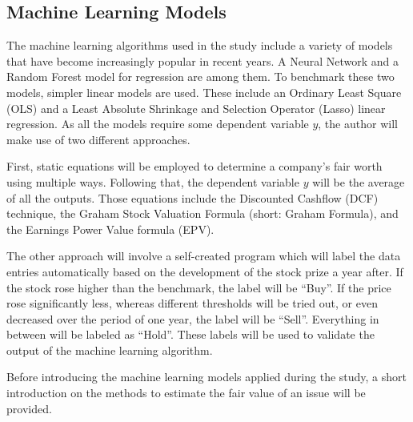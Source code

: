 \documentclass{imc-inf}
\begin{document}
\subsection{Machine Learning Models}%
The machine learning algorithms used in the study include a variety of models that have become increasingly popular in recent years. A Neural Network and a Random Forest model for regression are among them. To benchmark these two models, simpler linear models are used. These include an Ordinary Least Square (OLS) and a Least Absolute Shrinkage and Selection Operator (Lasso) linear regression. As all the models require some dependent variable $y$, the author will make use of two different approaches. 

First, static equations will be employed to determine a company's fair worth using multiple ways. Following that, the dependent variable $y$ will be the average of all the outputs. Those equations include the Discounted Cashflow (DCF) technique, the Graham Stock Valuation Formula (short: Graham Formula), and the Earnings Power Value formula (EPV).

The other approach will involve a self-created program which will label the data entries automatically based on the development of the stock prize a year after. If the stock rose higher than the benchmark, the label will be “Buy”. If the price rose significantly less, whereas different thresholds will be tried out, or even decreased over the period of one year, the label will be “Sell”. Everything in between will be labeled as “Hold”. These labels will be used to validate the output of the machine learning algorithm.

Before introducing the machine learning models applied during the study, a short introduction on the methods to estimate the fair value of an issue will be provided.
\end{document}
